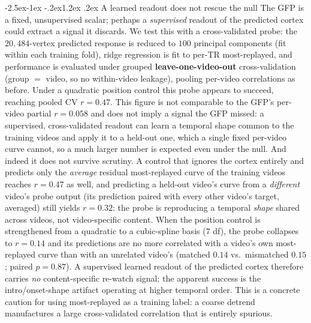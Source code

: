 \documentclass[11pt]{article}
\makeatletter
\renewcommand\subsection{\@startsection{subsection}{2}{\z@}%
  {-2.5ex\@plus -1ex \@minus -.2ex}{1.2ex \@plus .2ex}%
  {\normalfont\normalsize\sffamily\bfseries}}
\makeatother
\begin{document}
\subsection{A learned readout does not rescue the null}\label{sec:probe}
The GFP is a fixed, unsupervised scalar; perhaps a \emph{supervised} readout of the predicted
cortex could extract a signal it discards. We test this with a cross-validated probe: the
$20{,}484$-vertex predicted response is reduced to $100$ principal components (fit within each
training fold), ridge regression is fit to per-TR most-replayed, and performance is evaluated under
grouped \textbf{leave-one-video-out} cross-validation (group $=$ video, so no within-video
leakage), pooling per-video correlations as before. Under a quadratic position control this probe
appears to succeed, reaching pooled CV $r=0.47$. This figure is not comparable to the
GFP's per-video partial $r=0.058$ and does not imply a signal the GFP missed: a supervised,
cross-validated readout can learn a temporal shape common to the training videos and apply it to a
held-out one, which a single fixed per-video curve cannot, so a much larger number is expected even
under the null. And indeed it does not survive scrutiny. A
control that ignores the cortex entirely and predicts only the \emph{average} residual
most-replayed curve of the training videos reaches $r=0.47$ as well, and predicting a held-out
video's curve from a \emph{different} video's probe output (its prediction paired with every other
video's target, averaged) still yields $r=0.32$: the probe is
reproducing a temporal \emph{shape} shared across videos, not video-specific content. When the
position control is strengthened from a quadratic to a cubic-spline basis ($7$ df), the probe
collapses to $r=0.14$ and its predictions are no more correlated with a video's own most-replayed
curve than with an unrelated video's (matched $0.14$ vs.\ mismatched $0.15$; paired $p=0.87$). A
supervised learned readout of the predicted cortex therefore carries \emph{no} content-specific
re-watch signal; the apparent success is the intro/onset-shape artifact operating at higher
temporal order. This is a concrete caution for using most-replayed as a training label: a coarse
detrend manufactures a large cross-validated correlation that is entirely spurious.
\end{document}
